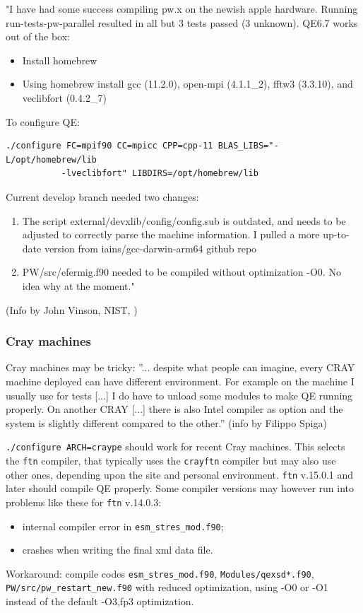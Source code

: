 \documentclass[12pt,a4paper]{article}
\begin{document}
"I have had some success compiling pw.x on the newish apple hardware.
Running run-tests-pw-parallel resulted in all but 3 tests passed (3 unknown).
QE6.7 works out of the box:
\begin{itemize}
\item Install homebrew
\item Using homebrew install gcc (11.2.0), open-mpi (4.1.1\_2), 
fftw3 (3.3.10), and veclibfort (0.4.2\_7)
\end{itemize}
To configure QE: 
\begin{verbatim}
./configure FC=mpif90 CC=mpicc CPP=cpp-11 BLAS_LIBS="-L/opt/homebrew/lib
           -lveclibfort" LIBDIRS=/opt/homebrew/lib
\end{verbatim}
Current develop branch needed two changes:
\begin{enumerate}
\item The script external/devxlib/config/config.sub is outdated, 
and needs to be adjusted to correctly parse the machine information. 
I pulled a more up-to-date version from iains/gcc-darwin-arm64 github repo\\
\item PW/src/efermig.f90 needed to be compiled without optimization -O0. 
No idea why at the moment."
\end{enumerate}
(Info by John Vinson, NIST, )

\subsubsection{Cray machines}

Cray machines may be tricky:
''... despite what people can imagine, every CRAY machine deployed can
have different environment. For example on the machine I usually use
for tests [...] I do have to unload some modules to make QE running
properly. On another CRAY [...] there is also Intel compiler as option
and the system is slightly different compared to the other.'' 
(info by Filippo Spiga)

\texttt{./configure ARCH=craype} should work for recent Cray machines.
This selects the \texttt{ftn} compiler, that typically uses
the \texttt{crayftn} compiler but may also use other ones,
depending upon the site and personal environment. \texttt{ftn} v.15.0.1
and later should compile QE properly. Some compiler versions may however
run into problems like these for \texttt{ftn} v.14.0.3:
\begin{itemize}
\item internal compiler error in \verb|esm_stres_mod.f90|;
\item crashes when writing the final xml data file.
\end{itemize}
Workaround: compile codes \verb|esm_stres_mod.f90|,
\verb|Modules/qexsd*.f90|, \verb|PW/src/pw_restart_new.f90|
with reduced optimization, using -O0 or -O1 instead of the default
-O3,fp3 optimization.
\end{document}
